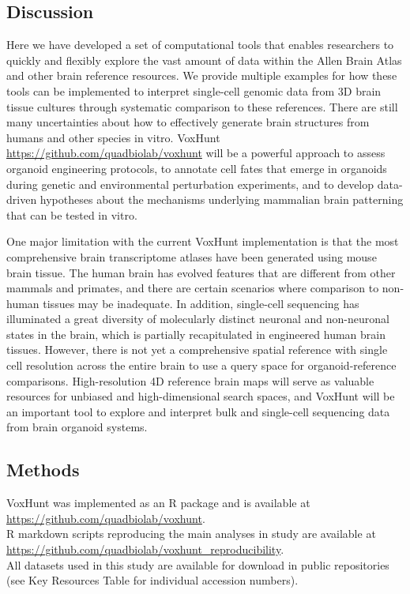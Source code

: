 \subsection{Discussion}
Here we have developed a set of computational tools that enables researchers to quickly and flexibly explore the vast amount of data within the Allen Brain Atlas and other brain reference resources. We provide multiple examples for how these tools can be implemented to interpret single-cell genomic data from 3D brain tissue cultures through systematic comparison to these references. There are still many uncertainties about how to effectively generate brain structures from humans and other species in vitro. VoxHunt \href{https://github.com/quadbiolab/voxhunt}{https://github.com/quadbiolab/voxhunt} will be a powerful approach to assess organoid engineering protocols, to annotate cell fates that emerge in organoids during genetic and environmental perturbation experiments, and to develop data-driven hypotheses about the mechanisms underlying mammalian brain patterning that can be tested in vitro. 

One major limitation with the current VoxHunt implementation is that the most comprehensive brain transcriptome atlases have been generated using mouse brain tissue. The human brain has evolved features that are different from other mammals and primates, and there are certain scenarios where comparison to non-human tissues may be inadequate. In addition, single-cell sequencing has illuminated a great diversity of molecularly distinct neuronal and non-neuronal states in the brain, which is partially recapitulated in engineered human brain tissues. However, there is not yet a comprehensive spatial reference with single cell resolution across the entire brain to use a query space for organoid-reference comparisons. High-resolution 4D reference brain maps will serve as valuable resources for unbiased and high-dimensional search spaces, and VoxHunt will be an important tool to explore and interpret bulk and single-cell sequencing data from brain organoid systems. 


\subsection{Methods}

VoxHunt was implemented as an R package and is available at\\\href{https://github.com/quadbiolab/voxhunt}{https://github.com/quadbiolab/voxhunt}. \\
R markdown scripts reproducing the main analyses in study are available at\\ 
\href{https://github.com/quadbiolab/voxhunt_reproducibility}{https://github.com/quadbiolab/voxhunt\_reproducibility}.\\
All datasets used in this study are available for download in public repositories (see Key Resources Table for individual accession numbers). 


